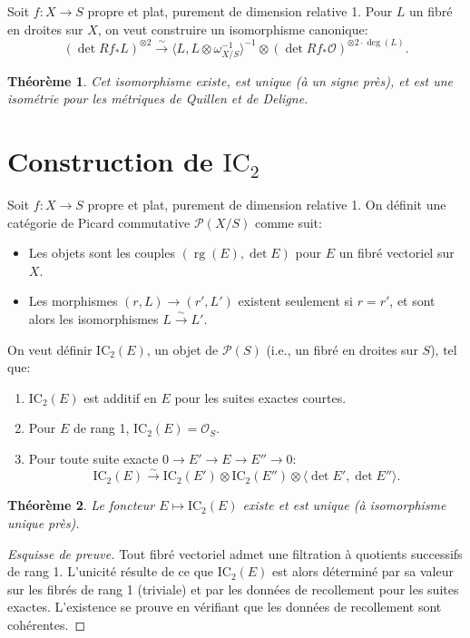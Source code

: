 \documentclass[11pt,a4paper]{article}
\theoremstyle{plain}
\newtheorem{theorem}{Th\'eor\`eme}[section]
\theoremstyle{definition}
\DeclareMathOperator{\rg}{rg}
\newcommand{\IC}{\mathrm{IC}}
\newcommand{\cO}{\mathcal{O}}
\newcommand{\cP}{\mathcal{P}}
\begin{document}
Soit $f: X \to S$ propre et plat, purement de dimension relative 1. Pour $L$ un fibr\'e en droites sur $X$, on veut construire un isomorphisme canonique:
\begin{equation}
(\det Rf_* L)^{\otimes 2} \xrightarrow{\sim} \langle L, L \otimes \omega_{X/S}^{-1} \rangle^{-1} \otimes (\det Rf_* \cO)^{\otimes 2 \cdot \deg(L)}.
\end{equation}

\begin{theorem}
Cet isomorphisme existe, est unique (\`a un signe pr\`es), et est une isom\'etrie pour les m\'etriques de Quillen et de Deligne.
\end{theorem}

\section{Construction de $\IC_2$}

Soit $f: X \to S$ propre et plat, purement de dimension relative 1. On d\'efinit une cat\'egorie de Picard commutative $\cP(X/S)$ comme suit:
\begin{itemize}
\item Les objets sont les couples $(\rg(E), \det E)$ pour $E$ un fibr\'e vectoriel sur $X$.
\item Les morphismes $(r, L) \to (r', L')$ existent seulement si $r = r'$, et sont alors les isomorphismes $L \xrightarrow{\sim} L'$.
\end{itemize}

On veut d\'efinir $\IC_2(E)$, un objet de $\cP(S)$ (i.e., un fibr\'e en droites sur $S$), tel que:
\begin{enumerate}
\item[(i)] $\IC_2(E)$ est additif en $E$ pour les suites exactes courtes.
\item[(ii)] Pour $E$ de rang 1, $\IC_2(E) = \cO_S$.
\item[(iii)] Pour toute suite exacte $0 \to E' \to E \to E'' \to 0$:
\begin{equation}
\IC_2(E) \xrightarrow{\sim} \IC_2(E') \otimes \IC_2(E'') \otimes \langle \det E', \det E'' \rangle.
\end{equation}
\end{enumerate}

\begin{theorem}
Le foncteur $E \mapsto \IC_2(E)$ existe et est unique (\`a isomorphisme unique pr\`es).
\end{theorem}

\begin{proof}[Esquisse de preuve]
Tout fibr\'e vectoriel admet une filtration \`a quotients successifs de rang 1. L'unicit\'e r\'esulte de ce que $\IC_2(E)$ est alors d\'etermin\'e par sa valeur sur les fibr\'es de rang 1 (triviale) et par les donn\'ees de recollement pour les suites exactes. L'existence se prouve en v\'erifiant que les donn\'ees de recollement sont coh\'erentes.
\end{proof}
\end{document}
